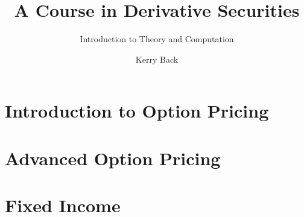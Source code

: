 \documentclass[envcountsame,envcountchapter]{svmono}
\begin{document}
\author{Kerry Back}
\title{A Course in Derivative Securities}
\subtitle{Introduction to Theory and Computation}

\maketitle

\frontmatter




\tableofcontents

\mainmatter

\part{Introduction to Option Pricing}








\part{Advanced Option Pricing}







\part{Fixed Income}\label{p_fixedincome} 








\appendix



\backmatter

\renewcommand{\listfigurename}{List of Programs}
 \listoffigures{}
 



\printindex
\end{document}
